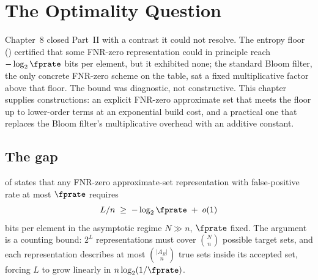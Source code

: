 %

\section{The Optimality Question}
\label{sec:optimality-question}

Chapter~8 closed Part~II with a contrast it could not resolve. The
entropy floor
() certified that some FNR-zero
representation could in principle reach $-\log_2 \fprate$ bits per
element, but it exhibited none; the standard Bloom filter, the only
concrete FNR-zero scheme on the table, sat a fixed multiplicative
factor above that floor. The bound was diagnostic, not constructive.
This chapter supplies constructions: an explicit FNR-zero approximate
set that meets the floor up to lower-order terms at an exponential
build cost, and a practical one that replaces the Bloom filter's
multiplicative overhead with an additive constant.

\subsection*{The gap}

 of  states that any
FNR-zero approximate-set representation with false-positive rate at
most $\fprate$ requires
\[
  L / n \;\ge\; -\log_2 \fprate \;+\; o(1)
\]
bits per element in the asymptotic regime $N \gg n$, $\fprate$ fixed.
The argument is a counting bound: $2^L$ representations must cover
$\binom{N}{n}$ possible target sets, and each representation describes
at most $\binom{|A_R|}{n}$ true sets inside its accepted set, forcing
$L$ to grow linearly in $n \log_2(1/\fprate)$.

